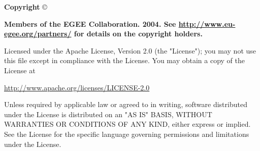 %
%
%
%
%
\vfill{}

{\bf
Copyright} \copyright\ {\bf Members of the EGEE Collaboration. 2004.  See
\href{http://www.eu-egee.org/partners/}{http://www.eu-egee.org/partners/} for
details on the copyright holders.  

Licensed under the Apache License, Version 2.0 (the "License"); you may not use
this file except in compliance with the License.  You may obtain a copy of the
License at 

\begin{center}
\href{http://www.apache.org/licenses/LICENSE-2.0}{http://www.apache.org/licenses/LICENSE-2.0}
\end{center}

Unless required by applicable law or agreed to in writing, software distributed
under the License is distributed on an "AS IS" BASIS, WITHOUT WARRANTIES OR
CONDITIONS OF ANY KIND, either express or implied.  See the License for the
specific language governing permissions and limitations under the License.
}

